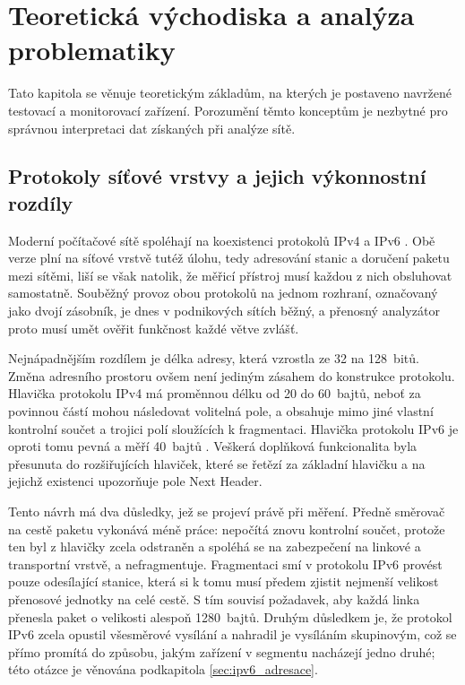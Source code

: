 \chapter{Teoretická východiska a analýza problematiky}
\label{sec:teorie}

Tato kapitola se věnuje teoretickým základům, na kterých je postaveno navržené testovací a monitorovací zařízení. Porozumění těmto konceptům je nezbytné pro správnou interpretaci dat získaných při analýze sítě.

\section{Protokoly síťové vrstvy a jejich výkonnostní rozdíly}
\label{sec:ipv4_ipv6}

Moderní počítačové sítě spoléhají na koexistenci protokolů IPv4 a IPv6 \cite{nastase2024}. Obě verze plní na síťové vrstvě tutéž úlohu, tedy adresování stanic a doručení paketu mezi sítěmi, liší se však natolik, že měřicí přístroj musí každou z nich obsluhovat samostatně. Souběžný provoz obou protokolů na jednom rozhraní, označovaný jako dvojí zásobník, je dnes v podnikových sítích běžný, a přenosný analyzátor proto musí umět ověřit funkčnost každé větve zvlášť.

Nejnápadnějším rozdílem je délka adresy, která vzrostla ze 32 na 128~bitů. Změna adresního prostoru ovšem není jediným zásahem do konstrukce protokolu. Hlavička protokolu IPv4 má proměnnou délku od 20 do 60~bajtů, neboť za povinnou částí mohou následovat volitelná pole, a obsahuje mimo jiné vlastní kontrolní součet a trojici polí sloužících k fragmentaci. Hlavička protokolu IPv6 je oproti tomu pevná a měří 40~bajtů \cite{rfc8200}. Veškerá doplňková funkcionalita byla přesunuta do rozšiřujících hlaviček, které se řetězí za základní hlavičku a na jejichž existenci upozorňuje pole Next Header.

Tento návrh má dva důsledky, jež se projeví právě při měření. Předně směrovač na cestě paketu vykonává méně práce: nepočítá znovu kontrolní součet, protože ten byl z hlavičky zcela odstraněn a spoléhá se na zabezpečení na linkové a transportní vrstvě, a nefragmentuje. Fragmentaci smí v protokolu IPv6 provést pouze odesílající stanice, která si k tomu musí předem zjistit nejmenší velikost přenosové jednotky na celé cestě. S tím souvisí požadavek, aby každá linka přenesla paket o velikosti alespoň 1280~bajtů. Druhým důsledkem je, že protokol IPv6 zcela opustil všesměrové vysílání a nahradil je vysíláním skupinovým, což se přímo promítá do způsobu, jakým zařízení v segmentu nacházejí jedno druhé; této otázce je věnována podkapitola \ref{sec:ipv6_adresace}.

